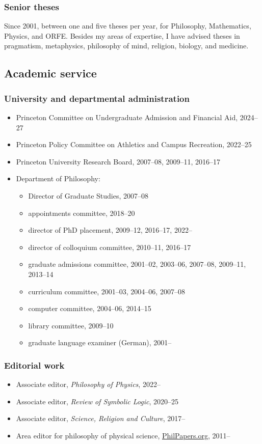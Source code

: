 \documentclass[11pt]{article}
\newcommand{\rubric}[1]{\subsubsection*{#1}}
\begin{document}
\rubric{Senior theses}

Since 2001, between one and five theses per year, for Philosophy,
Mathematics, Physics, and ORFE. Besides my areas of expertise, I have advised
theses in pragmatism, metaphysics, philosophy of mind, religion, biology, and
medicine.


\subsection*{Academic service}

\rubric{University and departmental administration}

\begin{itemize}
\item Princeton Committee on Undergraduate Admission and Financial Aid,
  2024--27
\item Princeton Policy Committee on Athletics and Campus Recreation, 2022--25
\item Princeton University Research Board, 2007--08, 2009--11, 2016--17
\item Department of Philosophy:
  \begin{itemize}
  \item Director of Graduate Studies, 2007--08
  \item appointments committee, 2018--20
  \item director of PhD placement, 2009--12, 2016--17, 2022--
  \item director of colloquium committee, 2010--11, 2016--17
  \item graduate admissions committee, 2001--02, 2003--06, 2007--08,
    2009--11, 2013--14
  \item curriculum committee, 2001--03, 2004--06, 2007--08
  \item computer committee, 2004--06, 2014--15
  \item library committee, 2009--10
  \item graduate language examiner (German), 2001--
  \end{itemize}
\end{itemize}

\rubric{Editorial work}

\begin{itemize}
\item Associate editor, \emph{Philosophy of Physics}, 2022--
\item Associate editor, \emph{Review of Symbolic Logic}, 2020--25
\item Associate editor, \emph{Science, Religion and Culture}, 2017--
\item Area editor for philosophy of physical science,
  \href{http://www.philpapers.org}{PhilPapers.org}, 2011--
\end{itemize}
\end{document}
